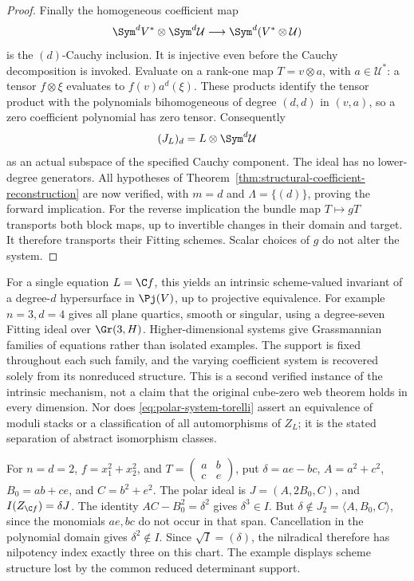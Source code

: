 \begin{proof}
Finally the homogeneous coefficient map
\begin{equation}\label{eq:polar-cauchy-inclusion}
 \Sym^d V^*\otimes\Sym^d\mathcal U
       \longrightarrow\Sym^d(V^*\otimes\mathcal U)
\end{equation}
is the \((d)\)-Cauchy inclusion.  It is injective even before the
Cauchy decomposition is invoked.  Evaluate on a rank-one map
\(T=v\otimes a\), with \(a\in\mathcal U^*\): a tensor
\(f\otimes\xi\) evaluates to \(f(v)a^d(\xi)\).  These products
identify the tensor product with the polynomials bihomogeneous of
degree \((d,d)\) in \((v,a)\), so a zero coefficient polynomial
has zero tensor.  Consequently
\begin{equation}\label{eq:polar-left-module}
                  (J_L)_d=L\otimes\Sym^d\mathcal U
\end{equation}
as an actual subspace of the specified Cauchy component.  The ideal
has no lower-degree generators.  All hypotheses of
Theorem~\ref{thm:structural-coefficient-reconstruction} are now
verified, with \(m=d\) and \(\Lambda=\{(d)\}\), proving the
forward implication.  For the reverse implication the bundle map
\(T\mapsto gT\) transports both block maps, up to invertible
changes in their domain and target.  It therefore transports their
Fitting schemes.  Scalar choices of \(g\) do not alter the system.
\end{proof}

For a single equation \(L=\C f\), this yields an intrinsic
scheme-valued invariant of a degree-\(d\) hypersurface in
\(\Pj(V)\), up to projective equivalence.  For example \(n=3,d=4\)
gives all plane quartics, smooth or singular, using a degree-seven
Fitting ideal over \(\Gr(3,H)\).  Higher-dimensional systems give
Grassmannian families of equations rather than isolated examples.
The support is fixed throughout each such family, and the varying
coefficient system is recovered solely from its nonreduced structure.
This is a second verified instance of the intrinsic mechanism, not a
claim that the original cube-zero web theorem holds in every dimension.
Nor does \eqref{eq:polar-system-torelli} assert an equivalence of
moduli stacks or a classification of all automorphisms of \(Z_L\);
it is the stated separation of abstract isomorphism classes.

\begin{example}
\label{ex:polar-nilpotence-three}
For \(n=d=2\), \(f=x_1^2+x_2^2\), and
\(T=\left(\begin{smallmatrix}a&b\\c&e\end{smallmatrix}\right)\),
put \(\delta=ae-bc\), \(A=a^2+c^2\), \(B_0=ab+ce\),
and \(C=b^2+e^2\).  The polar ideal is
\(J=(A,2B_0,C)\), and \(I(Z_{\C f})=\delta J\).
The identity \(AC-B_0^2=\delta^2\) gives \(\delta^3\in I\).
But \(\delta\notin J_2=\langle A,B_0,C\rangle\), since the
monomials \(ae,bc\) do not occur in that span.  Cancellation in
the polynomial domain gives \(\delta^2\notin I\).
Since \(\sqrt I=(\delta)\), the nilradical therefore has
nilpotency index exactly three on this chart.  The example displays
scheme structure lost by the common reduced determinant support.
\end{example}
